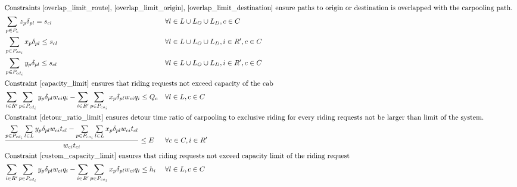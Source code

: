 \begin{align}
  \intertext{Constraints \eqref{overlap_limit_route}, \eqref{overlap_limit_origin}, \eqref{overlap_limit_destination} ensure paths to origin or destination is overlapped with the carpooling path. }
  & \sum\limits_{p \in P_{c}} z_{p} \delta_{pl} = s_{cl} && \forall l \in L \cup L_O \cup L_D, c \in C \label{overlap_limit_route} \\
  & \sum\limits_{p \in P_{co_i}} x_{p} \delta_{pl} \leq s_{cl} && \forall l \in L \cup L_O \cup L_D, i \in R', c \in C \label{overlap_limit_origin} \\
  & \sum\limits_{p \in P_{cd_i}} y_{p} \delta_{pl} \leq s_{cl} && \forall l \in L \cup L_O \cup L_D, i \in R', c \in C \label{overlap_limit_destination} \\
  \intertext{Constraint \eqref{capacity_limit} ensures that riding requests not exceed capacity of the cab}
  & \sum\limits_{i \in R'} \sum\limits_{p \in P_{cd_i}} y_{p} \delta_{pl} w_{ci} q_i - \sum\limits_{i \in R'} \sum\limits_{p \in P_{co_i}} x_{p} \delta_{pl} w_{ci} q_i \leq Q_c && \forall l \in L, c \in C \label{capacity_limit} \\
  \intertext{Constraint \eqref{detour_ratio_limit} ensures detour time ratio of carpooling to exclusive riding for every riding requests not be larger than limit of the system.}
  & \frac{\sum\limits_{p \in P_{cd_i}} \sum\limits_{l \in L} y_{p} \delta_{pl} w_{ci} t_{cl} - \sum\limits_{p \in P_{co_i}} \sum\limits_{l \in L} x_{p} \delta_{pl} w_{ci} t_{cl}}{w_{ci} t_{ci}} \leq E && \forall c \in C, i \in R' \label{detour_ratio_limit} \\
  \intertext{Constraint \eqref{custom_capacity_limit} ensures that riding requests not exceed capacity limit of the riding request}
  & \sum\limits_{i \in R'} \sum\limits_{p \in P_{cd_i}} y_{p} \delta_{pl} w_{ci} q_i - \sum\limits_{i \in R'} \sum\limits_{p \in P_{co_i}} x_{p} \delta_{pl} w_{ci} q_i \leq h_i && \forall l \in L, c \in C \label{custom_capacity_limit} \\

\end{align}
